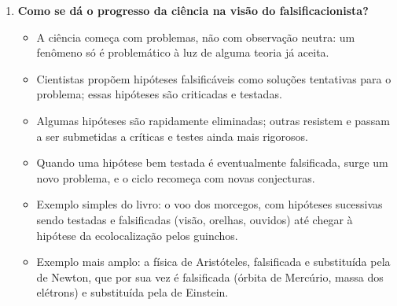 \documentclass[10pt,a4paper]{extarticle}
\begin{document}
\begin{enumerate}[label=\textbf{\arabic*.}, itemsep=10pt]
\item \textbf{Como se dá o progresso da ciência na visão do falsificacionista?}
\begin{itemize}
  \item A ciência começa com problemas, não com observação neutra: um fenômeno só é problemático à luz de alguma teoria já aceita.
  \item Cientistas propõem hipóteses falsificáveis como soluções tentativas para o problema; essas hipóteses são criticadas e testadas.
  \item Algumas hipóteses são rapidamente eliminadas; outras resistem e passam a ser submetidas a críticas e testes ainda mais rigorosos.
  \item Quando uma hipótese bem testada é eventualmente falsificada, surge um novo problema, e o ciclo recomeça com novas conjecturas.
  \item Exemplo simples do livro: o voo dos morcegos, com hipóteses sucessivas sendo testadas e falsificadas (visão, orelhas, ouvidos) até chegar à hipótese da ecolocalização pelos guinchos.
  \item Exemplo mais amplo: a física de Aristóteles, falsificada e substituída pela de Newton, que por sua vez é falsificada (órbita de Mercúrio, massa dos elétrons) e substituída pela de Einstein.
\end{itemize}

\end{enumerate}
\end{document}
